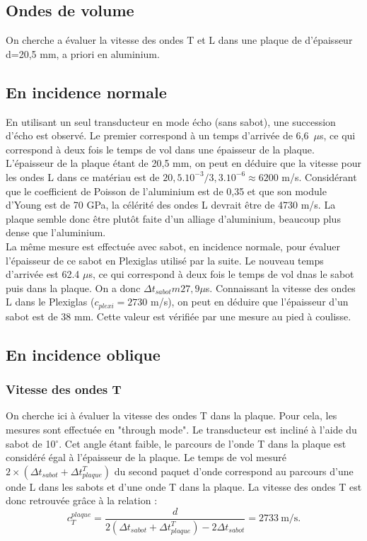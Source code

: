 \documentclass[twoside]{article}
\begin{document}
\begin{multicols}{2}
\section{Ondes de volume}

On cherche a évaluer la vitesse des ondes T et L dans une plaque de d'épaisseur d=20,5 mm, a priori en aluminium. 

\subsection{En incidence normale}

En utilisant un seul transducteur en mode écho (sans sabot), une succession d'écho est observé. Le premier correspond à un temps d'arrivée de 6,6~$\mu$s, ce qui correspond à deux fois le temps de vol dans une épaisseur de la plaque. L'épaisseur de la plaque étant de 20,5 mm, on peut en déduire que la vitesse pour les ondes L dans ce matériau est de $20,5.10^{-3}/3,3.10^{-6}\approx6200$ m/s. Considérant que le coefficient de Poisson de l'aluminium est de 0,35 et que son module d'Young est de 70 GPa, la célérité des ondes L devrait être de 4730 m/s. La plaque semble donc être plutôt faite d'un alliage d'aluminium, beaucoup plus dense que l'aluminium.\\

La même mesure est effectuée avec sabot, en incidence normale, pour évaluer l'épaisseur de ce sabot en Plexiglas utilisé par la suite. Le nouveau temps d'arrivée est 62.4 $\mu$s, ce qui correspond à deux fois le temps de vol dnas le sabot puis dans la plaque. On a donc $\Delta t_{sabot}m27,9 \mu$s. Connaissant la vitesse des ondes L dans le Plexiglas ($c_{plexi}=2730$ m/s), on peut en déduire que l'épaisseur d'un sabot est de 38 mm. Cette valeur est vérifiée par une mesure au pied à coulisse.

\subsection{En incidence oblique}
	\subsubsection{Vitesse des ondes T}
	On cherche ici à évaluer la vitesse des ondes T dans la plaque. Pour cela, les mesures sont effectuée en "through mode".
	Le transducteur est incliné à l'aide du sabot de 10$^{\circ}$. Cet angle étant faible, le parcours de l'onde T dans la plaque est considéré égal à l'épaisseur de la plaque. Le temps de vol mesuré $2\times(\Delta t_{sabot}+\Delta t_{plaque}^T)$ du second paquet d'onde correspond au parcours d'une onde L dans les sabots et d'une onde T dans la plaque. La vitesse des ondes T est donc retrouvée grâce à la relation : 
	$$c_{T}^{plaque}=\frac{d}{2(\Delta t_{sabot}+\Delta t_{plaque}^T)-2\Delta t_{sabot}}=2733~ \text{m/s.}$$
	

\end{multicols}
\end{document}
